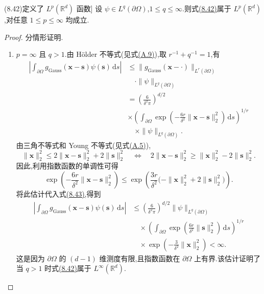 \begin{lemma}[式\hyperref[eq:commutation-error-integral]{(8.42)}定义了 $L^p(\mathbb{R}^d)$ 函数]
\label{lem:gaussian-commutation-Lp}
设 $\psi\in L^q(\partial\Omega)$,$1\le q\le\infty$.则式\hyperref[eq:commutation-error-integral]{(8.42)}属于 $L^p(\mathbb{R}^d)$,对任意 $1\le p\le\infty$ 均成立.
\end{lemma}
\begin{proof}
分情形证明.
\begin{enumerate}[label=\roman*)]
 \item $p=\infty$ 且 $q>1$.由 Hölder 不等式(见式\hyperref[eq:appendix-a-9]{(A.9)}),取 $r^{-1}+q^{-1}=1$,有
 \begin{equation}\label{eq:commutation-error-Lp-pointwise}
 \begin{aligned}
  \left|\int_{\partial\Omega}
    g_{\mathrm{Gauss}}(\bm{x}-\bm{s})\psi(\bm{s})\,\mathrm{d}s\right|
  &\!\le\!
    \|g_{\mathrm{Gauss}}(\bm{x}-\cdot)\|_{L^r(\partial\Omega)}\\
  &\quad\cdot\|\psi\|_{L^q(\partial\Omega)}\\
  &=\left(\frac{6}{\delta^2\pi}\right)^{d/2}\\
  &\times
    \left(\int_{\partial\Omega}
      \exp\!\left(-\frac{6r}{\delta^2}
                  \|\bm{x}-\bm{s}\|_2^2\right)\,\mathrm{d}s\right)^{1/r}\\
  &\quad\times\|\psi\|_{L^q(\partial\Omega)}.
 \end{aligned}
 \end{equation}
 由三角不等式和 Young 不等式(见式\hyperref[eq:appendix-a-5]{(A.5)}),
 \[
  \|\bm{x}\|_2^2
   \le 2\|\bm{x}-\bm{s}\|_2^2+2\|\bm{s}\|_2^2
  \quad\Longleftrightarrow\quad
  2\|\bm{x}-\bm{s}\|_2^2
   \ge \|\bm{x}\|_2^2-2\|\bm{s}\|_2^2.
 \]
 因此,利用指数函数的单调性可得
 \[
  \exp\!\left(-\frac{6r}{\delta^2}
                  \|\bm{x}-\bm{s}\|_2^2\right)
  \le
  \exp\!\left(\frac{3r}{\delta^2}
        \bigl(-\|\bm{x}\|_2^2+2\|\bm{s}\|_2^2\bigr)\right).
 \]
 将此估计代入式\hyperref[eq:commutation-error-Lp-pointwise]{(8.43)},得到
 \begin{equation}\label{eq:commutation-error-Linfty-bound}
 \begin{aligned}
  \left|\int_{\partial\Omega}
    g_{\mathrm{Gauss}}(\bm{x}-\bm{s})\psi(\bm{s})\,\mathrm{d}s\right|
  &\le
   \left(\frac{6}{\delta^2\pi}\right)^{d/2}
   \|\psi\|_{L^q(\partial\Omega)}\\
  &\quad\times\left(\int_{\partial\Omega}
      \exp\!\left(\frac{6r}{\delta^2}\|\bm{s}\|_2^2\right)
      \,\mathrm{d}s\right)^{1/r}\\
  &\quad\times\exp\!\left(-\frac{3}{\delta^2}\|\bm{x}\|_2^2\right)
   <\infty.
 \end{aligned}
 \end{equation}
 这是因为 $\partial\Omega$ 的 $(d-1)$ 维测度有限,且指数函数在 $\partial\Omega$ 上有界.该估计证明了当 $q>1$ 时式\hyperref[eq:commutation-error-integral]{(8.42)}属于 $L^\infty(\mathbb{R}^d)$.


\end{enumerate}
\end{proof}
